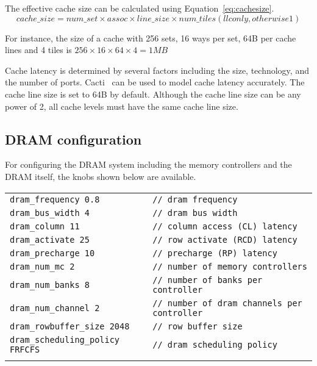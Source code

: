 \noindent The effective cache size can be calculated using Equation~\ref{eq:cachesize}.
\begin{equation}
\label{eq:cachesize}
cache\_size = num\_set \times assoc \times line\_size \times num\_tiles (llc only, otherwise 1)
\end{equation}


\noindent For instance, the size of a cache with 256 sets, 16 ways per set, 64B per cache lines and 4
tiles is $256 \times 16 \times 64 \times 4 = 1\textit{MB}$

Cache latency is determined by several factors including the
size, technology, and the number of ports. Cacti~\cite{cacti} can be
used to model cache latency accurately. The cache line size is set to
64B by default. Although the cache line size can be any power of 2,
all cache levels must have the same cache line size.


\subsection{DRAM configuration}
\label{sec:param-dram}

For configuring the DRAM system including the memory controllers and the DRAM
itself, the knobs shown below are available. 

\begin{tabular}{l l}
 \\
 \Verb+dram_frequency 0.8+ & \Verb+// dram frequency+ \\
 \Verb+dram_bus_width 4 + & \Verb+// dram bus width+ \\
 \Verb+dram_column 11+ & \Verb+// column access (CL) latency+ \\
 \Verb+dram_activate 25 + & \Verb+// row activate (RCD) latency+ \\
 \Verb+dram_precharge 10+ & \Verb+// precharge (RP) latency+ \\
 \Verb+dram_num_mc 2 + & \Verb+// number of memory controllers+ \\
 \Verb+dram_num_banks 8+ & \Verb+// number of banks per controller+ \\
 \Verb+dram_num_channel 2 + & \Verb+// number of dram channels per controller+ \\
 \Verb+dram_rowbuffer_size 2048 + & \Verb+// row buffer size+ \\
 \Verb+dram_scheduling_policy FRFCFS+ & \Verb+// dram scheduling policy+ \\
 \\
\end{tabular}

